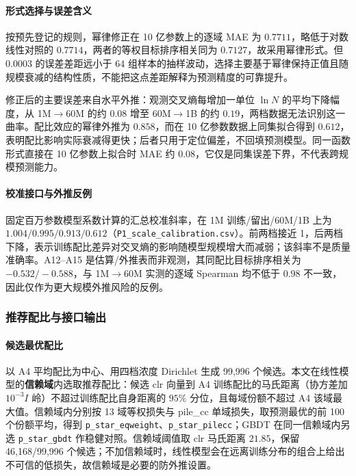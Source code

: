 \paragraph{形式选择与误差含义}按预先登记的规则，幂律修正在 10 亿参数上的逐域 MAE 为 $0.7711$，略低于对数线性对照的 $0.7714$，两者的等权目标排序相关同为 $0.7127$，故采用幂律形式。但 $0.0003$ 的误差差距远小于 64 组样本的抽样波动，选择主要基于幂律保持正值且随规模衰减的结构性质，不能把这点差距解释为预测精度的可靠提升。

修正后的主要误差来自水平外推：观测交叉熵每增加一单位 $\ln N$ 的平均下降幅度，从 1M$\to$60M 的约 $0.08$ 增至 60M$\to$1B 的约 $0.19$，两档数据无法识别这一曲率。配比效应的幂律外推为 $0.858$，而在 10 亿参数数据上同集拟合得到 $0.612$，表明配比影响实际衰减得更快；后者只用于定位偏差，不回填预测模型。同一函数形式直接在 10 亿参数上拟合时 MAE 约 $0.08$，它仅是同集误差下界，不代表跨规模预测能力。

\paragraph{校准接口与外推反例}固定百万参数模型系数计算的汇总校准斜率，在 1M 训练/留出/60M/1B 上为 $1.004/0.995/0.913/0.612$（\texttt{P1\_scale\_calibration.csv}）。前两档接近 1，后两档下降，表示训练配比差异对交叉熵的影响随模型规模增大而减弱；该斜率不是质量准确率。A12–A15 是估算/外推表而非观测，其同配比目标排序相关为 $-0.532/-0.588$，与 1M$\to$60M 实测的逐域 Spearman 均不低于 $0.98$ 不一致，因此仅作为更大规模外推风险的反例。

\subsubsection{推荐配比与接口输出}
\label{sec:q1_pstar}

\paragraph{候选最优配比}以 A4 平均配比为中心、用四档浓度 Dirichlet 生成 99,996 个候选。本文在线性模型的\textbf{信赖域}内选取推荐配比：候选 clr 向量到 A4 训练配比的马氏距离（协方差加 $10^{-3}I$ 岭）不超过训练配比自身距离的 $95\%$ 分位，且每域份额不超过 A4 该域最大值。信赖域内分别按 13 域等权损失与 pile\_cc 单域损失，取预测最优的前 100 个份额平均，得到 \texttt{p\_star\_eqweight}、\texttt{p\_star\_pilecc}；GBDT 在同一信赖域内另选 \texttt{p\_star\_gbdt} 作稳健对照。信赖域阈值取 clr 马氏距离 $21.85$，保留 46,168/99,996 个候选；不加信赖域时，线性模型会在远离训练分布的组合上给出不可信的低损失，故信赖域是必要的防外推设置。

